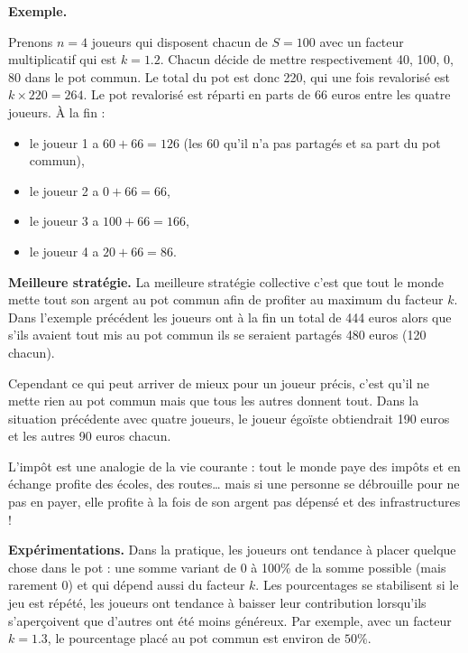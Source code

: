 \documentclass[11pt,class=report,crop=false]{standalone}
\begin{document}
\bigskip

\textbf{Exemple.}



Prenons $n=4$ joueurs qui disposent chacun de $S=100$ avec un facteur multiplicatif qui est $k=1.2$.
Chacun décide de mettre respectivement 40, 100, 0, 80 dans le pot commun.
Le total du pot est donc 220, qui une fois revalorisé est $k \times 220 = 264$.
Le pot revalorisé est réparti en parts de 66 euros entre les quatre joueurs.
À la fin :
\begin{itemize}
	\item le joueur 1 a $60+66 = 126$ (les 60 qu'il n'a pas partagés et sa part du pot commun), 
	\item le joueur 2 a $0+66 = 66$,
	\item le joueur 3 a $100+66 = 166$,
	\item le joueur 4 a $20+66 = 86$.			
\end{itemize} 

\medskip

\textbf{Meilleure stratégie.}
La meilleure stratégie collective c'est que tout le monde mette tout son argent au pot commun afin de profiter au maximum du facteur $k$. Dans l'exemple précédent les joueurs ont à la fin un total de 444 euros alors que s'ils avaient tout mis au pot commun ils se seraient partagés 480 euros (120 chacun).

Cependant ce qui peut arriver de mieux pour un joueur précis, c'est qu'il ne mette rien au pot commun mais que tous les autres donnent tout. Dans la situation précédente avec quatre joueurs, le joueur égoïste obtiendrait 190 euros et les autres 90 euros chacun.

L'impôt est une analogie de la vie courante : tout le monde paye des impôts et en échange profite des écoles, des routes\ldots{} mais si une personne se débrouille pour ne pas en payer, elle profite à la fois de son argent pas dépensé et des infrastructures !

\medskip

\textbf{Expérimentations.}
Dans la pratique, les joueurs ont tendance à placer quelque chose dans le pot : une somme variant de 0 à 100\% de la somme possible (mais rarement 0) et qui dépend aussi du facteur $k$. 
Les pourcentages se stabilisent si le jeu est répété, les joueurs ont tendance à baisser leur contribution lorsqu'ils s'aperçoivent que d'autres ont été moins généreux. Par exemple, avec un facteur $k=1.3$, le pourcentage placé au pot commun est environ de $50\%$.
\end{document}
